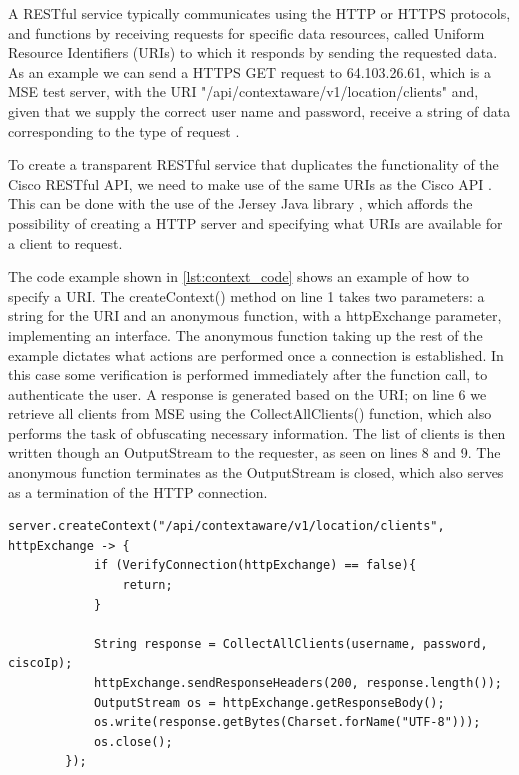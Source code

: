 A RESTful service typically communicates using the HTTP or HTTPS protocols, and functions by receiving requests for specific data resources, called Uniform Resource Identifiers (URIs) to which it responds by sending the requested data. As an example we can send a HTTPS GET request to 64.103.26.61, which is a MSE test server, with the URI "/api/contextaware/v1/location/clients" and, given that we supply the correct user name and password, receive a string of data corresponding to the type of request \cite{restful_oracle}.

To create a transparent RESTful service that duplicates the functionality of the Cisco RESTful API, we need to make use of the same URIs as the Cisco API \cite{cisco_mse_api}. This can be done with the use of the Jersey Java library \cite{restful_in_java}, which affords the possibility of creating a HTTP server and specifying what URIs are available for a client to request.

The code example shown in \cref{lst:context_code} shows an example of how to specify a URI. The createContext() method on line 1 takes two parameters: a string for the URI and an anonymous function, with a httpExchange parameter, implementing an interface. The anonymous function taking up the rest of the example dictates what actions are performed once a connection is established. In this case some verification is performed immediately after the function call, to authenticate the user. A response is generated based on the URI; on line 6 we retrieve all clients from MSE using the CollectAllClients() function, which also performs the task of obfuscating necessary information. The list of clients is then written though an OutputStream to the requester, as seen on lines 8 and 9. The anonymous function terminates as the OutputStream is closed, which also serves as a termination of the HTTP connection. 

\begin{lstlisting}[caption={Adding a URI},label={lst:context_code},language=inc_Java]
server.createContext("/api/contextaware/v1/location/clients", httpExchange -> {
            if (VerifyConnection(httpExchange) == false){
                return;
            }

            String response = CollectAllClients(username, password, ciscoIp);
            httpExchange.sendResponseHeaders(200, response.length());
            OutputStream os = httpExchange.getResponseBody();
            os.write(response.getBytes(Charset.forName("UTF-8")));
            os.close();
        });
\end{lstlisting}

